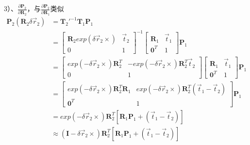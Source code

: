 \documentclass{article}
\begin{document}
3）、$\frac{\partial{\boldsymbol{P}_2}}{\partial{\boldsymbol{R}_2}}$，与$\frac{\partial{\boldsymbol{P}_2}}{\partial{\boldsymbol{R}_1}}$类似
\begin{equation}
	\begin{aligned}
		\boldsymbol{P}_2(\boldsymbol{R}_2\delta \vec{r}_2)                & =\boldsymbol{T}_2'^{-1}\boldsymbol{T}_1\boldsymbol{P}_1               \\&=
		\left[
		\begin{matrix}
		\boldsymbol{R}_2exp(\delta \vec{r}_2\times)                       & \vec{t}_2                                                             \\
		0                                                                 & 1                                                                     
		\end{matrix} 
		\right]^{-1}
		\left[ 
		\begin{matrix}  
		\boldsymbol{R}_1                                                  & \vec{t}_1                                                             \\ 
		\boldsymbol{0}^T                                                  & 1                                                                     
		\end{matrix}
		\right]   
		\boldsymbol{P}_1\\&=
		\left[ 
		\begin{matrix}
		exp(-\delta \vec{r}_2\times)\boldsymbol{R}_2^{T}                  & -exp(-\delta \vec{r}_2\times)\boldsymbol{R}_2^{T}\vec{t}_2            \\
		0                                                                 & 1                                                                     
		\end{matrix} 
		\right]
		\left[ 
		\begin{matrix} 
		\boldsymbol{R}_1                                                  & \vec{t}_1                                                             \\ 
		\boldsymbol{0}^T                                                  & 1                                                                     
		\end{matrix}
		\right]   
		\boldsymbol{P}_1\\&=
		\left[ 
		\begin{matrix} 
		exp(-\delta \vec{r}_2\times)\boldsymbol{R}_2^{T} \boldsymbol{R}_1 & exp(-\delta \vec{r}_2\times)\boldsymbol{R}_2^{T}(\vec{t}_1-\vec{t}_2) \\ 
		\boldsymbol{0}^T                                                  & 1                                                                     
		\end{matrix}
		\right]  
		\boldsymbol{P}_1 \\&=
		exp(-\delta \vec{r}_2\times)\boldsymbol{R}_2^{T}[ \boldsymbol{R}_1\boldsymbol{P}_1 +(\vec{t}_1-\vec{t}_2)]\\&\approx
		(\boldsymbol{I}-\delta \vec{r}_2\times)\boldsymbol{R}_2^{T}[ \boldsymbol{R}_1\boldsymbol{P}_1 +(\vec{t}_1-\vec{t}_2)]
	\end{aligned}
\end{equation}
\end{document}

